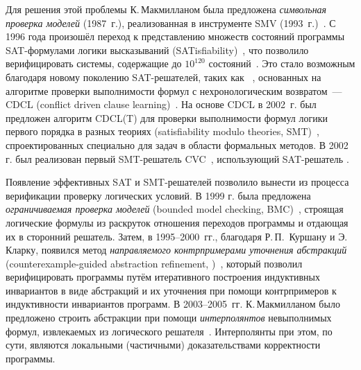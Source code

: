 Для решения этой проблемы К.\,Макмилланом была предложена \emph{символьная проверка моделей} (1987~г.), реализованная в инструменте SMV (1993~г.)~\cite{10.1007/3-540-61474-5_93}.
С 1996 года произошёл переход к представлению множеств состояний программы SAT-формулами логики высказываний (SATisfiability)~\cite{10.5555/1864519.1864564}, что позволило верифицировать системы, содержащие до  $10^{120}$ состояний~\cite{10.1007/3-540-61474-5_93}.
Это стало возможным благодаря новому поколению SAT-решателей, таких как \chaff{}~\cite{10.1145/378239.379017}, основанных на алгоритме проверки выполнимости формул с нехронологическим возвратом~--- CDCL (conflict driven clause learning)~\cite{silva1996grasp}.
На основе CDCL в 2002~г. был предложен алгоритм CDCL(T) для проверки выполнимости формул логики первого порядка в разных теориях (satisfiability modulo theories, SMT)~\cite{10.1007/3-540-45757-7_26}, спроектированных специально для задач в области формальных методов.
В 2002 г. был реализован первый SMT-решатель \textsc{CVC}~\cite{10.1007/3-540-45657-0_40}, использующий SAT-решатель \chaff{}.

Появление эффективных SAT и SMT-решателей позволило вынести из процесса верификации проверку логических условий.
В 1999 г. была предложена \emph{ограничиваемая проверка моделей} (bounded model checking, BMC)~\cite{10.1007/3-540-49059-0_14}, строящая логические формулы из раскруток отношения переходов программы и отдающая их в сторонний решатель.
Затем, в \numrange{1995}{2000}~гг., благодаря Р.\,П.~Куршану и Э.\,Кларку, появился метод \emph{направляемого контрпримерами уточнения абстракций} (counterexample-guided abstraction refinement, \cegar{})~\cite{Kurshan1995,cegar}, который позволил верифицировать программы путём итеративного построения индуктивных инвариантов в виде абстракций и их уточнения при помощи контрпримеров к индуктивности инвариантов программ.
В \numrange{2003}{2005}~гг. К.\,Макмилланом было предложено строить абстракции при помощи \emph{интерполянтов} невыполнимых формул, извлекаемых из логического решателя~\cite{10.1007/978-3-540-45069-6_1,10.1007/978-3-540-31980-1_1}.
Интерполянты при этом, по сути, являются локальными (частичными) доказательствами корректности программы.

